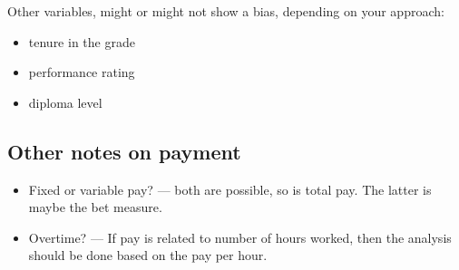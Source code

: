\documentclass[
]{article}
\providecommand{\tightlist}{%
  \setlength{\itemsep}{0pt}\setlength{\parskip}{0pt}}
\begin{document}
Other variables, might or might not show a bias, depending on your
approach:

\begin{itemize}
\tightlist
\item
  tenure in the grade
\item
  performance rating
\item
  diploma level
\end{itemize}

\hypertarget{other-notes-on-payment}{%
\subsection{Other notes on payment}\label{other-notes-on-payment}}

\begin{itemize}
\tightlist
\item
  Fixed or variable pay? --- both are possible, so is total pay. The
  latter is maybe the bet measure.
\item
  Overtime? --- If pay is related to number of hours worked, then the
  analysis should be done based on the pay per hour.
\end{itemize}
\end{document}
